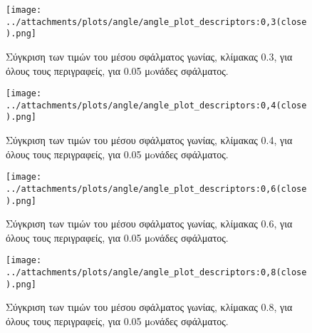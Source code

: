 \newpage


 
 \begin{figure}[ht!]
\begin{minipage}[b]{1.0\linewidth}
\centering
\texttt{[image: ../attachments/plots/angle/angle\_plot\_descriptors:0,3(close).png]}
\caption{Σύγκριση των τιμών του μέσου σφάλματος γωνίας, κλίμακας 0.3, για όλους τους περιγραφείς, για 0.05 μoνάδες σφάλματος.}
\label{fig:plot_scale_des_0.3_low}
\end{minipage}
 \end{figure} 
 \begin{figure}[ht!]
\begin{minipage}[b]{1.0\linewidth}
\centering
\texttt{[image: ../attachments/plots/angle/angle\_plot\_descriptors:0,4(close).png]}
\caption{Σύγκριση των τιμών του μέσου σφάλματος γωνίας, κλίμακας 0.4, για όλους τους περιγραφείς, για 0.05 μoνάδες σφάλματος.}
\label{fig:plot_scale_des_0.4_low}
\end{minipage}

 \end{figure} 
 
 \newpage
 
 
 \begin{figure}[ht!]
\begin{minipage}[b]{1.0\linewidth}
\centering
\texttt{[image: ../attachments/plots/angle/angle\_plot\_descriptors:0,6(close).png]}
\caption{Σύγκριση των τιμών του μέσου σφάλματος γωνίας, κλίμακας 0.6, για όλους τους περιγραφείς, για 0.05 μoνάδες σφάλματος.}
\label{fig:plot_scale_des_0.6_low}
\end{minipage}
 \end{figure} 
 \begin{figure}[ht!]
\begin{minipage}[b]{1.0\linewidth}
\centering
\texttt{[image: ../attachments/plots/angle/angle\_plot\_descriptors:0,8(close).png]}
\caption{Σύγκριση των τιμών του μέσου σφάλματος γωνίας, κλίμακας 0.8, για όλους τους περιγραφείς, για 0.05 μoνάδες σφάλματος.}
\label{fig:plot_scale_des_0.8_low}
\end{minipage}

 \end{figure} 
 
 \newpage
 
